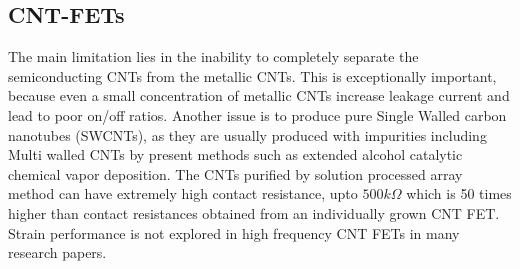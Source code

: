 \documentclass[a4paper,11pt]{article}
\begin{document}
\subsection{CNT-FETs}
The main limitation lies in the inability to completely separate the semiconducting CNTs from the metallic CNTs. This is exceptionally important, because even a small concentration of metallic CNTs increase leakage current and lead to poor on/off ratios. Another issue is to produce pure Single Walled carbon nanotubes (SWCNTs), as they are usually produced with impurities including Multi walled CNTs by present methods such as extended alcohol catalytic chemical vapor deposition\cite{hou2017extended}. The CNTs purified by solution processed array method can have extremely high contact resistance, upto $500k\Omega$ which is 50 times higher than contact resistances obtained from an individually grown CNT FET\cite{steiner2012high}. Strain performance is not explored in high frequency CNT FETs in many research papers.      
\newpage


\end{document}
